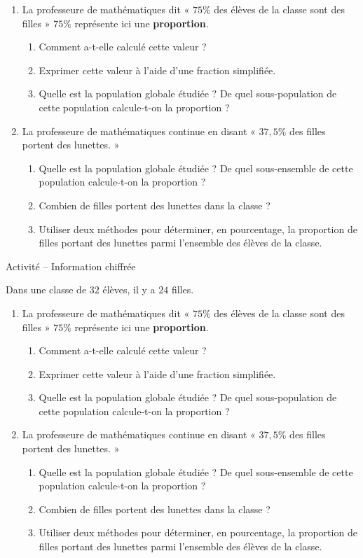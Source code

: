 \documentclass[11pt]{article}
\begin{document}
\begin{enumerate}
  \item La professeure de mathématiques dit « $75$\% des élèves de la classe
    sont des filles » $75\%$ représente ici une \textbf{proportion}.
    \begin{enumerate}
      \item Comment a-t-elle calculé cette valeur ?
      \item Exprimer cette valeur à l'aide d'une fraction simplifiée.
      \item Quelle est la population globale étudiée ? De quel sous-population
        de cette population calcule-t-on la proportion ?
    \end{enumerate}
  \item La professeure de mathématiques continue en disant « $37,5\%$ des filles
    portent des lunettes. »
    \begin{enumerate}
      \item Quelle est la population globale étudiée ? De quel sous-ensemble de
        cette population calcule-t-on la proportion ?
      \item Combien de filles portent des lunettes dans la classe ?
      \item Utiliser deux méthodes pour déterminer, en pourcentage, la
        proportion de filles portant des lunettes parmi l'ensemble des élèves de
        la classe.
    \end{enumerate}
\end{enumerate}
\vspace{1cm}
\begin{center}
  \LARGE Activité -- Information chiffrée
\end{center}
Dans une classe de $32$ élèves, il y a $24$ filles.
\begin{enumerate}
  \item La professeure de mathématiques dit « $75$\% des élèves de la classe
    sont des filles » $75\%$ représente ici une \textbf{proportion}.
    \begin{enumerate}
      \item Comment a-t-elle calculé cette valeur ?
      \item Exprimer cette valeur à l'aide d'une fraction simplifiée.
      \item Quelle est la population globale étudiée ? De quel sous-population
        de cette population calcule-t-on la proportion ?
    \end{enumerate}
  \item La professeure de mathématiques continue en disant « $37,5\%$ des filles
    portent des lunettes. »
    \begin{enumerate}
      \item Quelle est la population globale étudiée ? De quel sous-ensemble de
        cette population calcule-t-on la proportion ?
      \item Combien de filles portent des lunettes dans la classe ?
      \item Utiliser deux méthodes pour déterminer, en pourcentage, la
        proportion de filles portant des lunettes parmi l'ensemble des élèves de
        la classe.
    \end{enumerate}
\end{enumerate}
\end{document}
